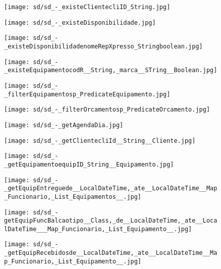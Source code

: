 \documentclass[relatorio.tex]{subfiles}
\begin{document}
\begin{landscape}
\begin{figure} \centering \texttt{[image: sd/sd\_-\_existeClientecliID\_String.jpg]} \end{figure}
\begin{figure} \centering \texttt{[image: sd/sd\_-\_existeDisponibilidade.jpg]} \end{figure}
\begin{figure} \centering \texttt{[image: sd/sd\_-\_existeDisponibilidadenomeRepXpresso\_Stringboolean.jpg]} \end{figure}
\begin{figure} \centering \texttt{[image: sd/sd\_-\_existeEquipamentocodR\_\_String,\_marca\_\_STring\_\_Boolean.jpg]} \end{figure}
\begin{figure} \centering \texttt{[image: sd/sd\_-\_filterEquipamentosp\_PredicateEquipamento.jpg]} \end{figure}
\begin{figure} \centering \texttt{[image: sd/sd\_-\_filterOrcamentosp\_PredicateOrcamento.jpg]} \end{figure}
\begin{figure} \centering \texttt{[image: sd/sd\_-\_getAgendaDia.jpg]} \end{figure}
\begin{figure} \centering \texttt{[image: sd/sd\_-\_getClientecliId\_\_String\_\_Cliente.jpg]} \end{figure}
\begin{figure} \centering \texttt{[image: sd/sd\_-\_getEquipamentoequipID\_String\_\_Equipamento.jpg]} \end{figure}
\begin{figure} \centering \texttt{[image: sd/sd\_-\_getEquipEntreguede\_\_LocalDateTime,\_ate\_\_LocalDateTime\_\_Map\_Funcionario,\_List\_Equipamentos\_\_.jpg]} \end{figure}
\begin{figure} \centering \texttt{[image: sd/sd\_-getEquipFuncBalcaotipo\_\_Class,\_de\_\_LocalDateTime,\_ate\_\_LocalDateTime\_\_\_Map\_Funcionario,\_List\_Equipamento\_\_.jpg]} \end{figure}
\begin{figure} \centering \texttt{[image: sd/sd\_-\_getEquipRecebidosde\_\_LocalDateTime,\_ate\_\_LocalDateTime\_\_Map\_Funcionario,\_List\_Equipamento\_\_.jpg]} \end{figure}

\end{landscape}
\end{document}
